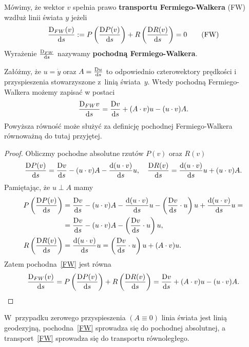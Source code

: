 \begin{definition}Mówimy, że wektor $v$ spełnia prawo \textbf{transportu 
Fermiego-Walkera} (FW) wzdłuż linii świata $y$ jeżeli
\begin{align} 
\frac{\text{D}_{FW} (v)}{\text{d} s}  :=  P \left(\frac{\text{D} P(v)}{\text{d} s} \right) +
R \left( \frac{\text{D} R(v)}{\text{d} s} \right) = 0
\tag{FW} \label{FW}
\end{align}
Wyrażenie $ \frac{{\text{D}}_{FW} }{\text{d} s}$ nazywamy \textbf{pochodną
Fermiego-Walkera}. 
\end{definition}
\begin{theorem}
Załóżmy, że $u = \dot{y}$ oraz $A=\frac{\text{D} u}{\text{d} s}$ 
to odpowiednio czterowektory
prędkości i przyspieszenia stowarzyszone z~linią świata~$y$.
Wtedy pochodną Fermiego-Walkera możemy zapisać w postaci
\begin{align} 
\frac{\text{D}_{FW} v}{\text{d} s}   = 
\frac{\text{D} v}{\text{d} s} +
(A\cdot v) u - (u\cdot v) A.
\end{align}
Powyższa równość może służyć za definicję
pochodnej Fermiego-Walkera~\cite{synge1960} 
równoważną do tutaj przyjętej.
\end{theorem}
\begin{proof}
Obliczmy pochodne absolutne rzutów $P(v)$ oraz $R(v)$
\begin{align*}
\frac{\text{D} P(v)}{\text{d} s} = \frac{\text{D} v}{\text{d} s} - (u\cdot v) A  
- \frac{\text{d} (u \cdot v)}{\text{d} s} u, \quad
\frac{\text{D} R(v)}{\text{d} s} =\frac{\text{d} (u \cdot v)}{\text{d} s} u + (u\cdot v) A .
\end{align*}
Pamiętając, że $u \perp A$ mamy
\begin{align*}
P \left( \frac{\text{D} P(v)}{\text{d} s}  \right) 
&= \frac{\text{D} v}{\text{d} s} - (u\cdot v) A  
- \frac{\text{d} (u \cdot v)}{\text{d} s} u 
-\left(\frac{\text{D} v}{\text{d} s} \cdot u \right)u 
+ \frac{\text{d} (u \cdot v)}{\text{d} s} u =\\
&= \frac{\text{D} v}{\text{d} s} - (u\cdot v) A  
-\left(\frac{\text{D} v}{\text{d} s} \cdot u \right)u ,\\
R\left( \frac{\text{D} R(v)}{\text{d} s} \right) 
&=\frac{\text{d} (u \cdot v)}{\text{d} s} u  = 
\left(\frac{\text{D} v}{\text{d} s} \cdot u \right)u 
+ (A\cdot v)u .
\end{align*}
Zatem pochodna~\ref{FW} jest równa 
\begin{align} 
\frac{\text{D}_{FW} (v)}{\text{d} s} = P \left(\frac{\text{D} P(v)}{\text{d} s} \right) +
R \left( \frac{\text{D} R(v)}{\text{d} s} \right) = 
\frac{\text{D} v}{\text{d} s} +
(A\cdot v) u - (u\cdot v) A.
\end{align}
\end{proof}
W~przypadku zerowego przyspieszenia $(A\equiv 0)$ linia świata
jest linią geodezyjną, pochodna~\eqref{FW} sprowadza się 
do pochodnej absolutnej, a transport~\eqref{FW} sprowadza się 
do transportu równoległego. 

